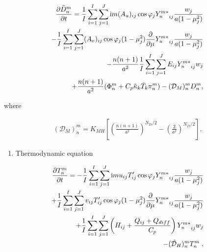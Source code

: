 \begin{eqnarray}
  \frac{\partial{\tilde{D}_n^m}}{\partial {t}}
   =  \frac{1}{I} \sum_{i=1}^{I} \sum_{j=1}^{J}  
          \mathrm{i}m (A_u)_{ij} \cos\varphi_j
          {Y_n^{m *}}_{ij}
         \frac{w_j}{a(1-\mu_j^{2})}
          \notag\\
    -    \frac{1}{I} \sum_{i=1}^{I} \sum_{j=1}^{J}  
          (A_v)_{ij} \cos\varphi_j
          (1-\mu_j^2)
          \frac{\partial }{\partial \mu} {Y_n^{m *}}_{ij}
          \frac{w_j}{a(1-\mu_j^{2})}
          \notag\\
    -   \frac{n(n+1)}{a^{2}}
         \frac{1}{I} \sum_{i=1}^{I} \sum_{j=1}^{J}  
          E_{ij} {Y_n^{m *}}_{ij} w_j
          \notag\\
    +   \frac{n(n+1)}{a^{2}}
          ( \Phi_n^m + C_{p} \hat{\kappa}_k \bar{T}_k \pi_n^m )
          -  ({\mathcal D}_M)_n^m D_n^m  ,
\end{eqnarray}

where

\begin{eqnarray}
({\mathcal D}_M)_n^m = K_{MH} \left[
                            \left( \frac{n(n+1)}{a^{2}} \right)^{N_D/2}
                            - \left( \frac{2}{a^2} \right)^{N_D/2}
                            \right]  .
\end{eqnarray}

\begin{enumerate}
\def\labelenumi{\arabic{enumi}.}
\setcounter{enumi}{2}
\tightlist
\item
  Thermodynamic equation
\end{enumerate}

\begin{eqnarray}
  \frac{\partial{T_n^m}}{\partial {t}}
   =  - \frac{1}{I} \sum_{i=1}^{I} \sum_{j=1}^{J}  
          \mathrm{i}m u_{ij} T'_{ij} \cos\varphi_j
          {Y_n^{m *}}_{ij}
         \frac{w_j}{a(1-\mu_j^{2})}
          \notag\\
     + \frac{1}{I} \sum_{i=1}^{I} \sum_{j=1}^{J}  
          v_{ij} T'_{ij} \cos\varphi_j
          (1-\mu_j^2)
          \frac{\partial }{\partial \mu} {Y_n^{m *}}_{ij}
          \frac{w_j}{a(1-\mu_j^{2})}
          \notag\\
     + \frac{1}{I} \sum_{i=1}^{I} \sum_{j=1}^{J}  
          \left( H_{ij} + \frac{Q_{ij}+Q_{diff}}{C_{p}} \right)
          {Y_n^{m *}}_{ij} w_j
          \notag\\
     - (\tilde{\mathcal D}_H)_n^m T_n^m \; ,
\end{eqnarray}

